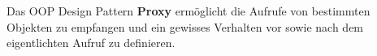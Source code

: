 Das OOP Design Pattern \textbf{Proxy} ermöglicht die Aufrufe von bestimmten Objekten 
zu empfangen und ein gewisses Verhalten vor sowie nach dem eigentlichten Aufruf zu definieren.